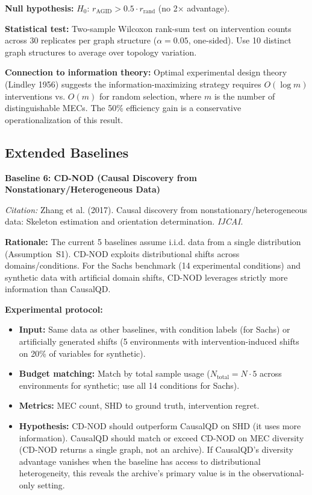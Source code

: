 \documentclass{article}
\theoremstyle{definition}
\theoremstyle{plain}
\theoremstyle{remark}
\begin{document}
\textbf{Null hypothesis:} $H_0$: $r_{\mathrm{AGID}} > 0.5 \cdot r_{\mathrm{rand}}$ (no 2× advantage).

\textbf{Statistical test:} Two-sample Wilcoxon rank-sum test on intervention counts
across 30 replicates per graph structure ($\alpha = 0.05$, one-sided). Use 10
distinct graph structures to average over topology variation.

\textbf{Connection to information theory:} Optimal experimental design theory
(Lindley 1956) suggests the information-maximizing strategy requires $O(\log m)$
interventions vs. $O(m)$ for random selection, where $m$ is the number of distinguishable
MECs. The 50\% efficiency gain is a conservative operationalization of this result.


\subsection*{Extended Baselines}

\textbf{Baseline 6: CD-NOD (Causal Discovery from Nonstationary/Heterogeneous Data)}

\emph{Citation:} Zhang et al. (2017). Causal discovery from nonstationary/heterogeneous data:
Skeleton estimation and orientation determination. \emph{IJCAI}.

\textbf{Rationale:} The current 5 baselines assume i.i.d. data from a single
distribution (Assumption~S1). CD-NOD exploits distributional shifts across domains/conditions.
For the Sachs benchmark (14 experimental conditions) and synthetic data with
artificial domain shifts, CD-NOD leverages strictly more information than CausalQD.

\textbf{Experimental protocol:}
\begin{itemize}
  \item \textbf{Input:} Same data as other baselines, with condition labels (for Sachs)
    or artificially generated shifts (5 environments with intervention-induced shifts
    on 20\% of variables for synthetic).
  \item \textbf{Budget matching:} Match by total sample usage ($N_{\text{total}} = N \cdot 5$
    across environments for synthetic; use all 14 conditions for Sachs).
  \item \textbf{Metrics:} MEC count, SHD to ground truth, intervention regret.
  \item \textbf{Hypothesis:} CD-NOD should outperform CausalQD on SHD (it uses more
    information). CausalQD should match or exceed CD-NOD on MEC diversity (CD-NOD
    returns a single graph, not an archive). If CausalQD's diversity advantage
    vanishes when the baseline has access to distributional heterogeneity, this
    reveals the archive's primary value is in the observational-only setting.
\end{itemize}
\end{document}
